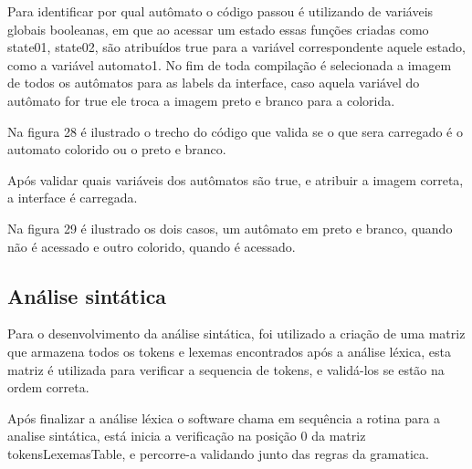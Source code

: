 \documentclass[12pt,oneside,a4paper,chapter=TITLE,section=TITLE,sumario=tradicional]{abntex2}
\begin{document}
\begin{figure}[htb]
\end{figure} 

Para identificar por qual autômato o código passou é utilizando de variáveis globais booleanas, em que ao acessar um estado essas funções criadas como state01, state02, são atribuídos true para a variável correspondente aquele estado, como a variável automato1. No fim de toda compilação é selecionada a imagem de todos os autômatos para as labels da interface, caso aquela variável do autômato for true ele troca a imagem preto e branco para a colorida.  

Na figura 28 é ilustrado o trecho do código que valida se o que sera carregado é o automato colorido ou o preto e branco. 

\begin{figure}[htb]
\end{figure} 

Após validar quais variáveis dos autômatos são true, e atribuir a imagem correta, a interface é carregada. 

Na figura 29 é ilustrado os dois casos, um autômato em preto e branco, quando não é acessado e outro colorido, quando é acessado. 

\begin{figure}[htb]
\end{figure} 

\subsection{Análise sintática}
\label{subsec:analisesintatica}

Para o desenvolvimento da análise sintática, foi utilizado a criação de uma matriz que armazena todos os tokens e lexemas encontrados após a análise léxica, esta matriz é utilizada para verificar a sequencia de tokens, e validá-los se estão na ordem correta.  

Após finalizar a análise léxica o software chama em sequência a rotina para a analise sintática, está inicia a verificação na posição 0 da matriz tokensLexemasTable, e percorre-a validando junto das regras da gramatica.  
\end{document}
